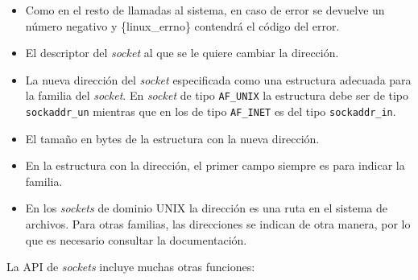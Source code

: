 \begin{Shaded}
\begin{Highlighting}[]
\OperatorTok{=} \OperatorTok{\{}
    \OperatorTok{=}\OperatorTok{,}        
    \OperatorTok{=}  
\OperatorTok{\};}

\OperatorTok{=}\OperatorTok{(} 
\OperatorTok{,} 
    \OperatorTok{(}\OperatorTok{*)} \OperatorTok{\&}\OperatorTok{,} 
    \OperatorTok{(}\OperatorTok{)} 
\OperatorTok{)}
\end{Highlighting}
\end{Shaded}

\begin{itemize}
\item
  Como en el resto de llamadas al sistema, en caso de error se devuelve
  un número negativo y \{linux\_errno\} contendrá el código del error.
\item
  El descriptor del \emph{socket} al que se le quiere cambiar la
  dirección.
\item
  La nueva dirección del \emph{socket} especificada como una estructura
  adecuada para la familia del \emph{socket}. En \emph{socket} de tipo
  \texttt{AF\_UNIX} la estructura debe ser de tipo \texttt{sockaddr\_un}
  mientras que en los de tipo \texttt{AF\_INET} es del tipo
  \texttt{sockaddr\_in}.
\item
  El tamaño en bytes de la estructura con la nueva dirección.
\item
  En la estructura con la dirección, el primer campo siempre es para
  indicar la familia.
\item
  En los \emph{sockets} de dominio UNIX la dirección es una ruta en el
  sistema de archivos. Para otras familias, las direcciones se indican
  de otra manera, por lo que es necesario consultar la documentación.
\end{itemize}

La API de \emph{sockets} incluye muchas otras funciones:

